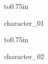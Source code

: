 \vskip 0.25in \vbox to0.75in {\parbox[t]{1in}{character\_01\vfil}\vfil}
\vskip 0.25in \vbox to0.75in {\parbox[t]{1in}{character\_02\vfil}\vfil}
